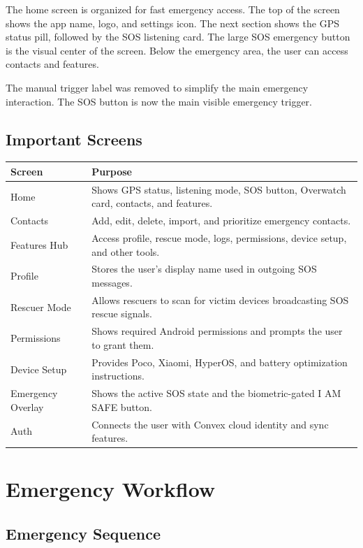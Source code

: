 \documentclass[12pt,a4paper]{report}
\begin{document}
The home screen is organized for fast emergency access. The top of the screen shows the app name, logo, and settings icon. The next section shows the GPS status pill, followed by the SOS listening card. The large SOS emergency button is the visual center of the screen. Below the emergency area, the user can access contacts and features.

The manual trigger label was removed to simplify the main emergency interaction. The SOS button is now the main visible emergency trigger.

\section{Important Screens}

\begin{longtable}{p{}p{}}
\toprule
\textbf{Screen} & \textbf{Purpose} \\
\midrule
Home & Shows GPS status, listening mode, SOS button, Overwatch card, contacts, and features. \\
Contacts & Add, edit, delete, import, and prioritize emergency contacts. \\
Features Hub & Access profile, rescue mode, logs, permissions, device setup, and other tools. \\
Profile & Stores the user's display name used in outgoing SOS messages. \\
Rescuer Mode & Allows rescuers to scan for victim devices broadcasting SOS rescue signals. \\
Permissions & Shows required Android permissions and prompts the user to grant them. \\
Device Setup & Provides Poco, Xiaomi, HyperOS, and battery optimization instructions. \\
Emergency Overlay & Shows the active SOS state and the biometric-gated I AM SAFE button. \\
Auth & Connects the user with Convex cloud identity and sync features. \\
\bottomrule
\end{longtable}

\chapter{Emergency Workflow}

\section{Emergency Sequence}
\end{document}
